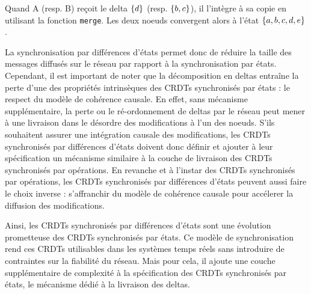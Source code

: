 Quand A (resp. B) reçoit le delta $\left\{d\right\}$ (resp. $\left\{b,c\right\}$), il l'intègre à sa copie en utilisant la fonction \texttt{merge}.
Les deux noeuds convergent alors à l'état $\left\{a,b,c,d,e\right\}$.

La synchronisation par différences d'états permet donc de réduire la taille des messages diffusés sur le réseau par rapport à la synchronisation par états.
Cependant, il est important de noter que la décomposition en deltas entraîne la perte d'une des propriétés intrinsèques des \acp{CRDT} synchronisés par états : le respect du modèle de cohérence causale.
En effet, sans mécanisme supplémentaire, la perte ou le ré-ordonnement de deltas par le réseau peut mener à une livraison dans le désordre des modifications à l'un des noeuds.
S'ils souhaitent assurer une intégration causale des modifications, les \acp{CRDT} synchronisés par différences d'états doivent donc définir et ajouter à leur spécification un mécanisme similaire à la couche de livraison des \acp{CRDT} synchronisés par opérations.
En revanche et à l'instar des \acp{CRDT} synchronisés par opérations, les \acp{CRDT} synchronisés par différences d'états peuvent aussi faire le choix inverse : s'affranchir du modèle de cohérence causale pour accélerer la diffusion des modifications.

Ainsi, les \acp{CRDT} synchronisés par différences d'états sont une évolution prometteuse des \acp{CRDT} synchronisés par états.
Ce modèle de synchronisation rend ces \acp{CRDT} utilisables dans les systèmes temps réels sans introduire de contraintes sur la fiabilité du réseau.
Mais pour cela, il ajoute une couche supplémentaire de complexité à la spécification des \acp{CRDT} synchronisés par états, \ie le mécanisme dédié à la livraison des deltas.
